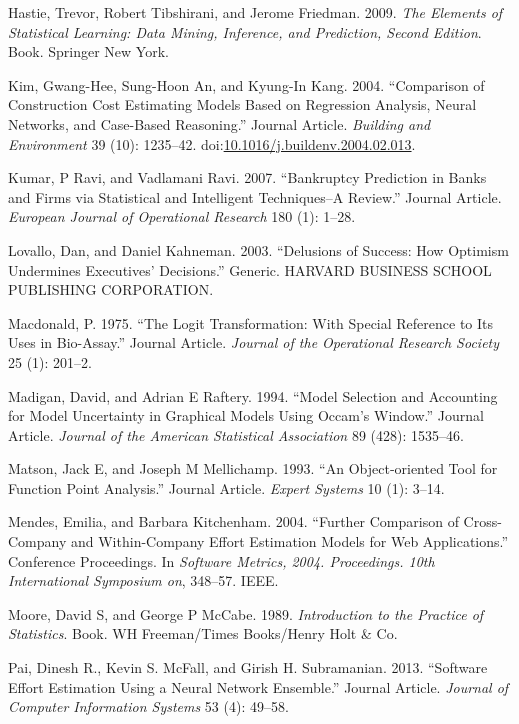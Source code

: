 \documentclass[]{elsarticle} %
\begin{document}
\hypertarget{ref-Hastie2009}{}
Hastie, Trevor, Robert Tibshirani, and Jerome Friedman. 2009. \emph{The
Elements of Statistical Learning: Data Mining, Inference, and
Prediction, Second Edition}. Book. Springer New York.

\hypertarget{ref-Kim2004}{}
Kim, Gwang-Hee, Sung-Hoon An, and Kyung-In Kang. 2004. ``Comparison of
Construction Cost Estimating Models Based on Regression Analysis, Neural
Networks, and Case-Based Reasoning.'' Journal Article. \emph{Building
and Environment} 39 (10): 1235--42.
doi:\href{https://doi.org/10.1016/j.buildenv.2004.02.013}{10.1016/j.buildenv.2004.02.013}.

\hypertarget{ref-Kumar2007}{}
Kumar, P Ravi, and Vadlamani Ravi. 2007. ``Bankruptcy Prediction in
Banks and Firms via Statistical and Intelligent Techniques--A Review.''
Journal Article. \emph{European Journal of Operational Research} 180
(1): 1--28.

\hypertarget{ref-Lovallo2003}{}
Lovallo, Dan, and Daniel Kahneman. 2003. ``Delusions of Success: How
Optimism Undermines Executives' Decisions.'' Generic. HARVARD BUSINESS
SCHOOL PUBLISHING CORPORATION.

\hypertarget{ref-Macdonald1975}{}
Macdonald, P. 1975. ``The Logit Transformation: With Special Reference
to Its Uses in Bio-Assay.'' Journal Article. \emph{Journal of the
Operational Research Society} 25 (1): 201--2.

\hypertarget{ref-Madigan1994}{}
Madigan, David, and Adrian E Raftery. 1994. ``Model Selection and
Accounting for Model Uncertainty in Graphical Models Using Occam's
Window.'' Journal Article. \emph{Journal of the American Statistical
Association} 89 (428): 1535--46.

\hypertarget{ref-Matson1993}{}
Matson, Jack E, and Joseph M Mellichamp. 1993. ``An Object‐oriented Tool
for Function Point Analysis.'' Journal Article. \emph{Expert Systems} 10
(1): 3--14.

\hypertarget{ref-Mendes2004}{}
Mendes, Emilia, and Barbara Kitchenham. 2004. ``Further Comparison of
Cross-Company and Within-Company Effort Estimation Models for Web
Applications.'' Conference Proceedings. In \emph{Software Metrics, 2004.
Proceedings. 10th International Symposium on}, 348--57. IEEE.

\hypertarget{ref-Moore1989}{}
Moore, David S, and George P McCabe. 1989. \emph{Introduction to the
Practice of Statistics}. Book. WH Freeman/Times Books/Henry Holt \& Co.

\hypertarget{ref-Pai2013}{}
Pai, Dinesh R., Kevin S. McFall, and Girish H. Subramanian. 2013.
``Software Effort Estimation Using a Neural Network Ensemble.'' Journal
Article. \emph{Journal of Computer Information Systems} 53 (4): 49--58.
\end{document}
